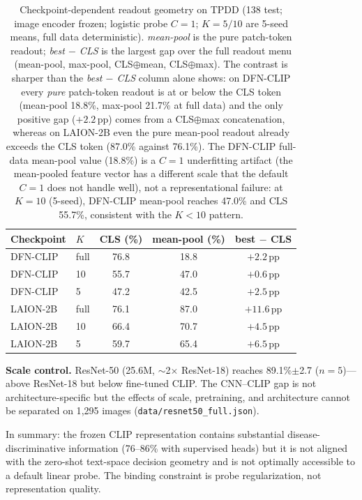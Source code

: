\documentclass[10pt,a4paper]{article}
\begin{document}
\begin{table}[!ht]
\centering
\caption{Checkpoint-dependent readout geometry on TPDD (138 test; image encoder frozen; logistic probe $C{=}1$; $K{=}5/10$ are 5-seed means, full data deterministic). \emph{mean-pool} is the pure patch-token readout; \emph{best $-$ CLS} is the largest gap over the full readout menu (mean-pool, max-pool, CLS$\oplus$mean, CLS$\oplus$max). The contrast is sharper than the \emph{best $-$ CLS} column alone shows: on DFN-CLIP every \emph{pure} patch-token readout is at or below the CLS token (mean-pool 18.8\%, max-pool 21.7\% at full data) and the only positive gap ($+2.2$\,pp) comes from a CLS$\oplus$max concatenation, whereas on LAION-2B even the pure mean-pool readout already exceeds the CLS token (87.0\% against 76.1\%). The DFN-CLIP full-data mean-pool value (18.8\%) is a $C{=}1$ underfitting artifact (the mean-pooled feature vector has a different scale that the default $C{=}1$ does not handle well), not a representational failure: at $K{=}10$ (5-seed), DFN-CLIP mean-pool reaches 47.0\% and CLS 55.7\%, consistent with the $K{<}10$ pattern.}
\label{tab:readout}
\begin{tabular}{llccc}
\toprule
\textbf{Checkpoint} & \textbf{$K$} & \textbf{CLS (\%)} & \textbf{mean-pool (\%)} & \textbf{best $-$ CLS} \\
\midrule
DFN-CLIP & full & 76.8 & 18.8 & $+2.2$\,pp \\
DFN-CLIP & 10 & 55.7 & 47.0 & $+0.6$\,pp \\
DFN-CLIP & 5 & 47.2 & 42.5 & $+2.5$\,pp \\
\midrule
LAION-2B & full & 76.1 & 87.0 & $+11.6$\,pp \\
LAION-2B & 10 & 66.4 & 70.7 & $+4.5$\,pp \\
LAION-2B & 5 & 59.7 & 65.4 & $+6.5$\,pp \\
\bottomrule
\end{tabular}
\end{table}

\textbf{Scale control.} ResNet-50 (25.6M, $\sim$2$\times$ ResNet-18) reaches 89.1\%$\pm$2.7 ($n{=}5$)---above ResNet-18 but below fine-tuned CLIP. The CNN--CLIP gap is not architecture-specific but the effects of scale, pretraining, and architecture cannot be separated on 1{,}295 images (\texttt{data/resnet50\_full.json}).

In summary: the frozen CLIP representation contains substantial disease-discriminative information (76--86\% with supervised heads) but it is not aligned with the zero-shot text-space decision geometry and is not optimally accessible to a default linear probe. The binding constraint is probe regularization, not representation quality.
\end{document}
